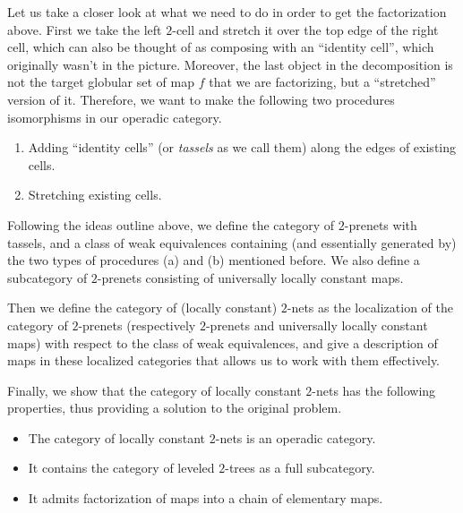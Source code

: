 \documentclass[letterpaper,12pt,leqno]{article}
\numberwithin{equation}{theorem}
\begin{document}
\begin{nparagraph}
Let us take a closer look at what we need to do in order to get the factorization above. First we take the left $2$-cell and stretch it over the top edge of the right cell,
which can also be thought of as composing with an ``identity cell'', which originally wasn't in the picture. Moreover, the last object in the decomposition is not
the target globular set of map $f$ that we are factorizing, but a ``stretched'' version of it. Therefore, we want to make the following two procedures isomorphisms in
our operadic category.
\begin{enumerate}[label=\alph*)]
\item Adding ``identity cells'' (or {\em tassels} as we call them) along the edges of existing cells.
\item Stretching existing cells.
\end{enumerate}

\end{nparagraph}

\begin{nparagraph}
Following the ideas outline above, we define the category of $2$-prenets with tassels, and a class of weak equivalences containing (and essentially generated by) the
two types of procedures (a) and (b) mentioned before. We also define a subcategory of $2$-prenets consisting of universally locally constant maps.

Then we define the category of (locally constant) $2$-nets as the localization of the category of $2$-prenets (respectively $2$-prenets and universally locally constant maps)
with respect to the class of weak equivalences, and give a description of maps in these localized categories that allows us to work with them effectively.

Finally, we show that the category of locally constant $2$-nets has the following properties, thus providing a solution to the original problem.
\begin{itemize}
\item The category of locally constant $2$-nets is an operadic category.
\item It contains the category of leveled $2$-trees as a full subcategory.
\item It admits factorization of maps into a chain of elementary maps.
\end{itemize}

\end{nparagraph}
\end{document}
